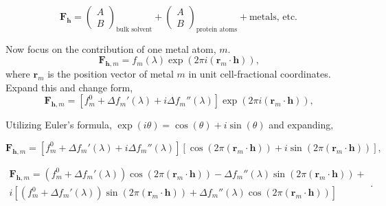 \documentclass[12pt, letterpaper]{article}
\begin{document}
       \begin{equation}
    \mathbf{F_h} =\left( \begin{array}{c}
      A \\
      B
    \end{array}\right)_{\textrm{bulk solvent}} +
    \left( \begin{array}{c}
      A \\
      B
    \end{array}\right)_{\textrm{protein atoms}} + \textrm{metals, etc.}
    \text{}
    \label{eqn:parts}
  \end{equation}

  Now focus on the contribution of one metal atom, $m$.
      \begin{equation}
    \mathbf{F}_{\mathbf{h},m} = f_m (\lambda)\exp(2\pi{i}(\mathbf{r}_m\cdot\mathbf{h}))
    \text{,}
    \label{eqn:vecF}
  \end{equation}
  where $\mathbf{r}_m$ is the position vector of metal $m$ in unit cell-fractional coordinates. Expand this
  and change form,
        \begin{equation}
    \mathbf{F}_{\mathbf{h},m} = [f^0_m + \Delta{f_m}\prime(\lambda) + i\Delta{{f_m}''}(\lambda)]
    \exp(2\pi{i}(\mathbf{r}_m\cdot\mathbf{h}))
    \text{,}
    \label{eqn:vecF}
  \end{equation}

  Utilizing Euler's formula, $\exp(i\theta)=\cos(\theta)+i\sin(\theta)$ and expanding,
  
     \begin{equation}
    \mathbf{F}_{\mathbf{h},m} = [f^0_m + \Delta{f_m}\prime(\lambda) + i\Delta{{f_m}''}(\lambda)]
    [\cos(2\pi(\mathbf{r}_m\cdot\mathbf{h})) + i \sin(2\pi(\mathbf{r}_m\cdot\mathbf{h}))
    ]
    \text{,}
    \label{eqn:vecF}
  \end{equation}
  
      \begin{equation}
    \begin{array}{c}\mathbf{F}_{\mathbf{h},m} =  (f^0_m + \Delta{f_m}\prime(\lambda)) \cos(2\pi(\mathbf{r}_m\cdot\mathbf{h})) - 
    \Delta{{f_m}''}(\lambda)\sin(2\pi(\mathbf{r}_m\cdot\mathbf{h})) + \\
    i[ (f^0_m + \Delta{f_m}\prime(\lambda))\sin(2\pi(\mathbf{r}_m\cdot\mathbf{h})) +\Delta{{f_m}''}(\lambda)\cos(2\pi(\mathbf{r}_m\cdot\mathbf{h})) ]

    \end{array}
    \text{.}
    \label{eqn:vec2F}
  \end{equation}
  
\end{document}
